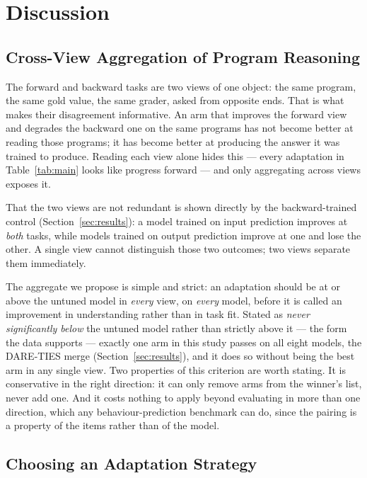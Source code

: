 \section{Discussion}
\label{sec:discussion}

\subsection{Cross-View Aggregation of Program Reasoning}
The forward and backward tasks are two views of one object: the same program, the same gold value,
the same grader, asked from opposite ends. That is what makes their disagreement informative. An arm
that improves the forward view and degrades the backward one on the same programs has not become
better at reading those programs; it has become better at producing the answer it was trained to
produce. Reading each view alone hides this --- every adaptation in Table~\ref{tab:main} looks like
progress forward --- and only aggregating across views exposes it.

That the two views are not redundant is shown directly by the backward-trained control
(Section~\ref{sec:results}): a model trained on input prediction improves at \emph{both} tasks, while
models trained on output prediction improve at one and lose the other. A single view cannot
distinguish those two outcomes; two views separate them immediately.

The aggregate we propose is simple and strict: an adaptation should be at or above the untuned model
in \emph{every} view, on \emph{every} model, before it is called an improvement in understanding
rather than in task fit. Stated as \emph{never significantly below} the untuned model rather than strictly above it --- the
form the data supports --- exactly one arm in this study passes on all eight models, the DARE-TIES
merge (Section~\ref{sec:results}), and it does so without being the best arm in any single view. Two properties of this criterion are worth stating. It is conservative in the
right direction: it can only remove arms from the winner's list, never add one. And it costs nothing
to apply beyond evaluating in more than one direction, which any behaviour-prediction benchmark can
do, since the pairing is a property of the items rather than of the model.

\subsection{Choosing an Adaptation Strategy}

